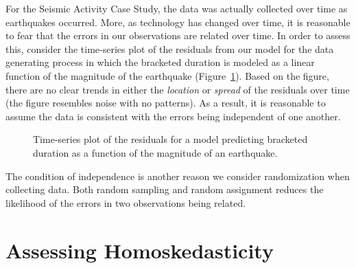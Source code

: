 \documentclass[
  letterpaper,
  DIV=11,
  numbers=noendperiod]{scrreprt}
\theoremstyle{definition}
\theoremstyle{definition}
\theoremstyle{plain}
\theoremstyle{remark}
\begin{document}
For the Seismic Activity Case Study, the data was actually collected
over time as earthquakes occurred. More, as technology has changed over
time, it is reasonable to fear that the errors in our observations are
related over time. In order to assess this, consider the time-series
plot of the residuals from our model for the data generating process in
which the bracketed duration is modeled as a linear function of the
magnitude of the earthquake
(Figure~\ref{fig-regassessment-independence}). Based on the figure,
there are no clear trends in either the \emph{location} or \emph{spread}
of the residuals over time (the figure resembles noise with no
patterns). As a result, it is reasonable to assume the data is
consistent with the errors being independent of one another.

\begin{figure}


\caption{\label{fig-regassessment-independence}Time-series plot of the
residuals for a model predicting bracketed duration as a function of the
magnitude of an earthquake.}

\end{figure}%

The condition of independence is another reason we consider
randomization when collecting data. Both random sampling and random
assignment reduces the likelihood of the errors in two observations
being related.

\section{Assessing Homoskedasticity}\label{assessing-homoskedasticity}
\end{document}
